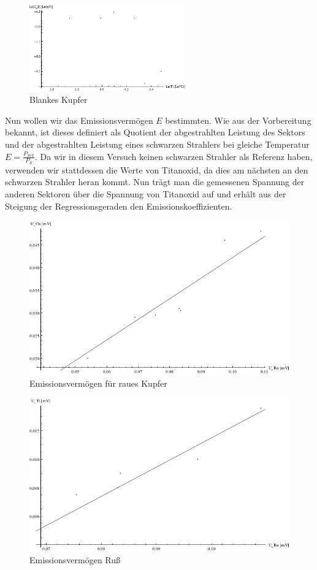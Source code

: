 \documentclass[12pt,twoside,a4paper]{article}
\begin{document}
\begin{figure}[H]
		\centering
		\includegraphics[width=0.6\textwidth]{bilder/warme_2_blank_cu.png} 
		\caption{Blankes Kupfer}
	\end{figure}
Nun wollen wir das Emissionsvermögen $E$ bestimmten. Wie aus der Vorbereitung bekannt, ist dieses definiert als Quotient der abgestrahlten Leistung des Sektors und der abgestrahlten Leistung eines schwarzen Strahlers bei gleiche Temperatur $E = \frac{P_{Sek}}{P_S}$. Da wir in diesem Versuch keinen schwarzen Strahler als Referenz haben, verwenden wir stattdessen die Werte von Titanoxid, da dies am nächsten an den schwarzen Strahler heran kommt. Nun trägt man die gemessenen Spannung der anderen Sektoren über die Spannung von Titanoxid auf und erhält aus der Steigung der Regressionsgeraden den Emissionskoeffizienten.
\begin{figure}[H]
		\centering
		\includegraphics[scale=.6]{bilder/waerme_2_2_cu.jpeg} 
		\caption{Emissionsvermögen für raues Kupfer}
	\end{figure}
	
\begin{figure}[H]
		\centering
		\includegraphics[scale=.6]{bilder/waerme_2_2_ru.jpeg} 
		\caption{Emissionsvermögen Ruß}
	\end{figure}
	
\end{document}

